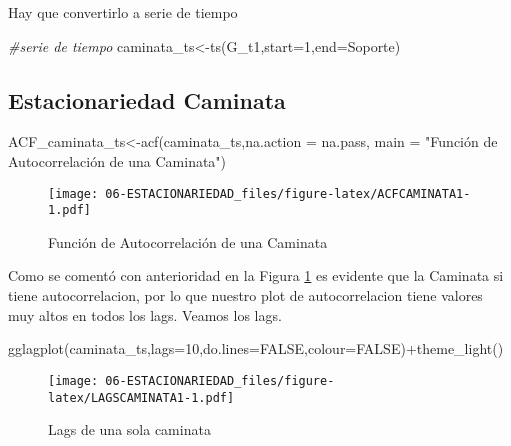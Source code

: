 \documentclass[
]{book}
\newenvironment{Shaded}{\begin{snugshade}}{\end{snugshade}}
\newcommand{\AttributeTok}[1]{\textcolor[rgb]{0.77,0.63,0.00}{#1}}
\newcommand{\CommentTok}[1]{\textcolor[rgb]{0.56,0.35,0.01}{\textit{#1}}}
\newcommand{\ConstantTok}[1]{\textcolor[rgb]{0.00,0.00,0.00}{#1}}
\newcommand{\DecValTok}[1]{\textcolor[rgb]{0.00,0.00,0.81}{#1}}
\newcommand{\FunctionTok}[1]{\textcolor[rgb]{0.00,0.00,0.00}{#1}}
\newcommand{\NormalTok}[1]{#1}
\newcommand{\OtherTok}[1]{\textcolor[rgb]{0.56,0.35,0.01}{#1}}
\newcommand{\SpecialCharTok}[1]{\textcolor[rgb]{0.00,0.00,0.00}{#1}}
\newcommand{\StringTok}[1]{\textcolor[rgb]{0.31,0.60,0.02}{#1}}
\begin{document}
Hay que convertirlo a serie de tiempo

\begin{Shaded}
\begin{Highlighting}[]
\CommentTok{\#serie de tiempo}
\NormalTok{caminata\_ts}\OtherTok{\textless{}{-}}\FunctionTok{ts}\NormalTok{(G\_t1,}\AttributeTok{start=}\DecValTok{1}\NormalTok{,}\AttributeTok{end=}\NormalTok{Soporte)}
\end{Highlighting}
\end{Shaded}

\hypertarget{estacionariedad-caminata}{%
\subsection{Estacionariedad Caminata}\label{estacionariedad-caminata}}

\begin{Shaded}
\begin{Highlighting}[]
\NormalTok{ACF\_caminata\_ts}\OtherTok{\textless{}{-}}\FunctionTok{acf}\NormalTok{(caminata\_ts,}\AttributeTok{na.action =}\NormalTok{ na.pass, }\AttributeTok{main =} \StringTok{"Función de Autocorrelación de una Caminata"}\NormalTok{)}
\end{Highlighting}
\end{Shaded}

\begin{figure}
\centering
\texttt{[image: 06-ESTACIONARIEDAD\_files/figure-latex/ACFCAMINATA1-1.pdf]}
\caption{\label{fig:ACFCAMINATA1}Función de Autocorrelación de una Caminata}
\end{figure}

Como se comentó con anterioridad en la Figura \ref{fig:ACFCAMINATA1} es
evidente que la Caminata si tiene autocorrelacion, por lo que nuestro
plot de autocorrelacion tiene valores muy altos en todos los lags.
Veamos los lags.

\begin{Shaded}
\begin{Highlighting}[]
\FunctionTok{gglagplot}\NormalTok{(caminata\_ts,}\AttributeTok{lags=}\DecValTok{10}\NormalTok{,}\AttributeTok{do.lines=}\ConstantTok{FALSE}\NormalTok{,}\AttributeTok{colour=}\ConstantTok{FALSE}\NormalTok{)}\SpecialCharTok{+}\FunctionTok{theme\_light}\NormalTok{()}
\end{Highlighting}
\end{Shaded}

\begin{figure}
\centering
\texttt{[image: 06-ESTACIONARIEDAD\_files/figure-latex/LAGSCAMINATA1-1.pdf]}
\caption{\label{fig:LAGSCAMINATA1}Lags de una sola caminata}
\end{figure}
\end{document}
